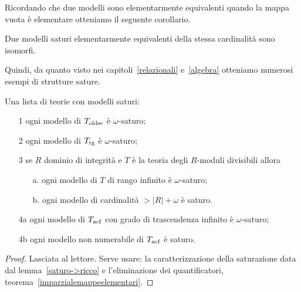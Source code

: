 Ricordando che due modelli sono elementarmente equivalenti quando la mappa vuota \`e  elementare otteniamo il seguente corollario.

\begin{corollary}\label{corollariosaturounico2}
Due modelli saturi elementarmente equivalenti della stessa cardinalit\`a sono isomorfi.\QED
\end{corollary}

Quindi, da quanto visto nei capitoli~\ref{relazionali} e~\ref{algebra} otteniamo numerosi esempi di strutture sature.

\begin{corollary}
Una lista di teorie con modelli saturi:
\begin{itemize}
\item[1] ogni modello di $T_{\rm oldse}$ \`e $\omega$-saturo;
\item[2] ogni modello di $T_{\rm rg}$ \`e $\omega$-saturo;
\item[3] se $R$ dominio di integrit\`a e $T$ \`e la teoria degli $R$-moduli divisibili allora
\begin{itemize}
\item[a.]ogni modello di $T$ di rango infinito \`e $\omega$-saturo;
\item[b.]ogni modello di cardinalit\`a $>|R|+\omega$ \`e saturo.
\end{itemize} 
\item[4a] ogni modello di $T_{\rm acf}$ con grado di trascendenza infinito \`e $\omega$-saturo;
\item[4b] ogni modello  non numerabile di $T_{\rm acf}$ \`e saturo.
\end{itemize}
\end{corollary}
\begin{proof}
Lasciata al lettore. Serve usare: la caratterizzazione della saturazione data dal lemma~\ref{saturo->ricco} e l'eliminazione dei quantificatori, teorema~\ref{imparzialemappeelementari}.
\end{proof}




